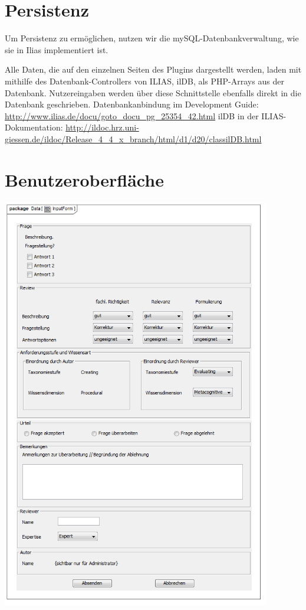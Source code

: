 \documentclass[a4paper]{scrreprt}
\begin{document}
\section{Persistenz}

Um Persistenz zu ermöglichen, nutzen wir die mySQL-Datenbankverwaltung, wie sie in Ilias implementiert ist. 

Alle Daten, die auf den einzelnen Seiten des Plugins dargestellt werden, laden mit mithilfe des Datenbank-Controllers von ILIAS, ilDB, als PHP-Arrays aus der Datenbank. 
Nutzereingaben werden über diese Schnittstelle ebenfalls direkt in die Datenbank geschrieben.
Datenbankanbindung im Development Guide: \url{http://www.ilias.de/docu/goto_docu_pg_25354_42.html}
ilDB in der ILIAS-Dokumentation: \url{http://ildoc.hrz.uni-giessen.de/ildoc/Release_4_4_x_branch/html/d1/d20/classilDB.html}

\section{Benutzeroberfläche}

\centering

\includegraphics[width=0.88\textwidth]{User_Interface_Modeling_Diagram__InputForm.png}
\label{Grafische Benutzeroberfläche}\newpage
\end{document}
